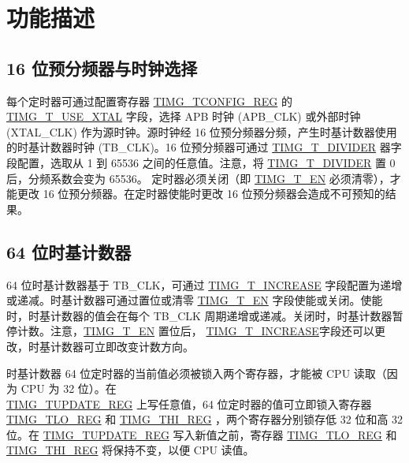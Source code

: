 \documentclass[main\_\_CN.tex]{subfiles}
\begin{document}
\newpage
\section{功能描述}

\subsection{16 位预分频器与时钟选择}

每个定时器可通过配置寄存器 \hyperref[regdesc:TIMGTXCONFIGREG]{TIMG\_TCONFIG\_REG} 的 \hyperref[fielddesc:TIMGTXUSEXTAL]{TIMG\_T\_USE\_XTAL} 字段，选择 APB 时钟 (APB\_CLK) 或外部时钟 (XTAL\_CLK) 作为源时钟。源时钟经 16 位预分频器分频，产生时基计数器使用的时基计数器时钟 (TB\_CLK)。16 位预分频器可通过 \hyperref[fielddesc:TIMGTXDIVIDER]{TIMG\_T\_DIVIDER} 器字段配置，选取从 1 到 65536 之间的任意值。注意，将 \hyperref[fielddesc:TIMGTXDIVIDER]{TIMG\_T\_DIVIDER} 置 0 后，分频系数会变为 65536。
定时器必须关闭（即 \hyperref[fielddesc:TIMGTXEN]{TIMG\_T\_EN} 必须清零），才能更改 16 位预分频器。在定时器使能时更改 16 位预分频器会造成不可预知的结果。

\subsection{64 位时基计数器}
64 位时基计数器基于 TB\_CLK，可通过 \hyperref[fielddesc:TIMGTXINCREASE]{TIMG\_T\_INCREASE} 字段配置为递增或递减。时基计数器可通过置位或清零 \hyperref[fielddesc:TIMGTXEN]{TIMG\_T\_EN} 字段使能或关闭。使能时，时基计数器的值会在每个 TB\_CLK 周期递增或递减。关闭时，时基计数器暂停计数。注意，\hyperref[fielddesc:TIMGTXEN]{TIMG\_T\_EN} 置位后， \hyperref[fielddesc:TIMGTXINCREASE]{TIMG\_T\_INCREASE}字段还可以更改，时基计数器可立即改变计数方向。

时基计数器 64 位定时器的当前值必须被锁入两个寄存器，才能被 CPU 读取（因为 CPU 为 32 位）。在 \\\hyperref[regdesc:TIMGTXUPDATEREG]{TIMG\_TUPDATE\_REG} 上写任意值，64 位定时器的值可立即锁入寄存器 \hyperref[regdesc:TIMGTXLOREG]{TIMG\_TLO\_REG} 和 \hyperref[regdesc:TIMGTXHIREG]{TIMG\_THI\_REG} ，两个寄存器分别锁存低 32 位和高 32 位。在 \hyperref[regdesc:TIMGTXUPDATEREG]{TIMG\_TUPDATE\_REG} 写入新值之前，寄存器 \hyperref[regdesc:TIMGTXLOREG]{TIMG\_TLO\_REG} 和 \hyperref[regdesc:TIMGTXHIREG]{TIMG\_THI\_REG} 将保持不变，以便 CPU 读值。
\end{document}
